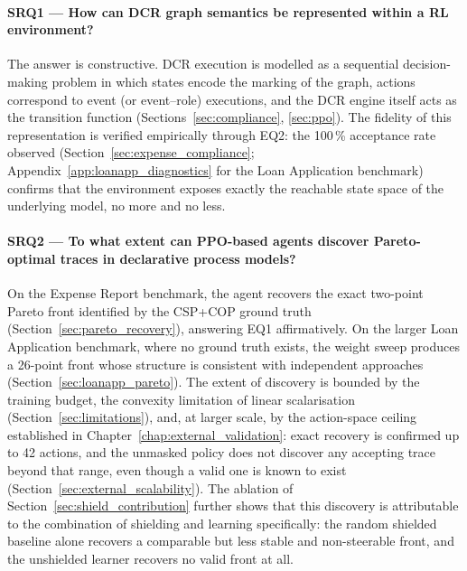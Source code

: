 \paragraph{SRQ1 --- How can \ac{DCR} graph semantics be represented within a \ac{RL} environment?} The answer is constructive. \ac{DCR} execution is modelled as a sequential decision-making problem in which states encode the marking of the graph, actions correspond to event (or event--role) executions, and the \ac{DCR} engine itself acts as the transition function (Sections~\ref{sec:compliance}, \ref{sec:ppo}). The fidelity of this representation is verified empirically through EQ2: the 100\,\% acceptance rate observed (Section~\ref{sec:expense_compliance}; Appendix~\ref{app:loanapp_diagnostics} for the Loan Application benchmark) confirms that the environment exposes exactly the reachable state space of the underlying model, no more and no less.

\paragraph{SRQ2 --- To what extent can \ac{PPO}-based agents discover Pareto-optimal traces in declarative process models?} On the Expense Report benchmark, the agent recovers the exact two-point Pareto front identified by the CSP+COP ground truth (Section~\ref{sec:pareto_recovery}), answering EQ1 affirmatively. On the larger Loan Application benchmark, where no ground truth exists, the weight sweep produces a 26-point front whose structure is consistent with independent approaches (Section~\ref{sec:loanapp_pareto}). The extent of discovery is bounded by the training budget, the convexity limitation of linear scalarisation (Section~\ref{sec:limitations}), and, at larger scale, by the action-space ceiling established in Chapter~\ref{chap:external_validation}: exact recovery is confirmed up to 42 actions, and the unmasked policy does not discover any accepting trace beyond that range, even though a valid one is known to exist (Section~\ref{sec:external_scalability}). The ablation of Section~\ref{sec:shield_contribution} further shows that this discovery is attributable to the combination of shielding and learning specifically: the random shielded baseline alone recovers a comparable but less stable and non-steerable front, and the unshielded learner recovers no valid front at all.

